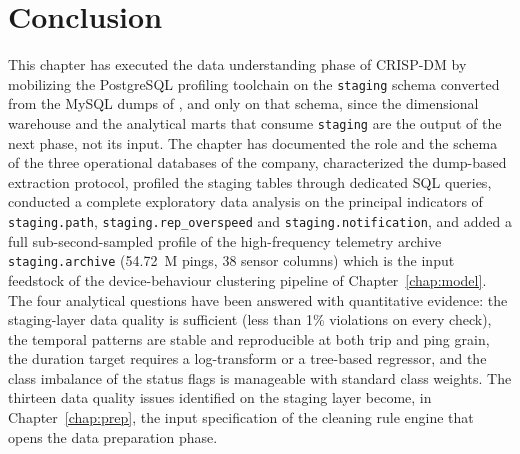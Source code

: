 \section{Conclusion}
This chapter has executed the data understanding phase of CRISP-DM by mobilizing the PostgreSQL profiling toolchain on the \texttt{staging} schema converted from the MySQL dumps of \hostorg, and only on that schema, since the dimensional warehouse and the analytical marts that consume \texttt{staging} are the output of the next phase, not its input. The chapter has documented the role and the schema of the three operational databases of the company, characterized the dump-based extraction protocol, profiled the staging tables through dedicated SQL queries, conducted a complete exploratory data analysis on the principal indicators of \texttt{staging.path}, \texttt{staging.rep\_overspeed} and \texttt{staging.notification}, and added a full sub-second-sampled profile of the high-frequency telemetry archive \texttt{staging.archive} (54.72~M pings, 38 sensor columns) which is the input feedstock of the device-behaviour clustering pipeline of Chapter~\ref{chap:model}. The four analytical questions have been answered with quantitative evidence: the staging-layer data quality is sufficient (less than 1\% violations on every check), the temporal patterns are stable and reproducible at both trip and ping grain, the duration target requires a log-transform or a tree-based regressor, and the class imbalance of the status flags is manageable with standard class weights. The thirteen data quality issues identified on the staging layer become, in Chapter~\ref{chap:prep}, the input specification of the cleaning rule engine that opens the data preparation phase.
